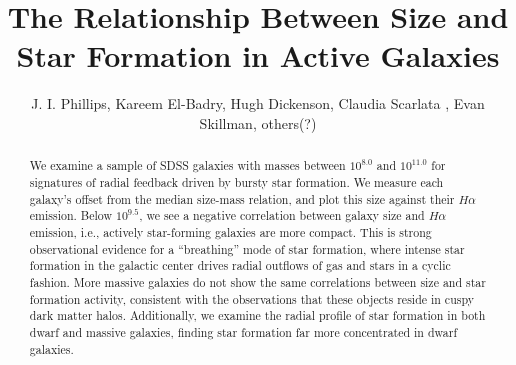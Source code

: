 \documentclass[iop]{emulateapj}
\begin{document}

\title{The Relationship Between Size and Star Formation in Active Galaxies}


\author{J. I. Phillips, Kareem El-Badry, Hugh Dickenson,  Claudia Scarlata , Evan Skillman, others(?)}




\begin{abstract}
We examine a sample of SDSS galaxies with masses between $10^{8.0}$ and $10^{11.0}$ for signatures of radial feedback driven by bursty star formation. We measure each galaxy's offset from the median size-mass relation, and plot this size against their $H\alpha$ emission. Below $10^{9.5}$, we see a negative correlation between galaxy size and $H\alpha$ emission, i.e., actively star-forming galaxies are more compact. This is strong observational evidence for a ``breathing'' mode of star formation, where intense star formation in the galactic center drives radial outflows of gas and stars in a cyclic fashion. More massive galaxies do not show the same correlations between size and star formation activity, consistent with the observations that these objects reside in cuspy dark matter halos. Additionally, we examine the radial profile of star formation in both dwarf and massive galaxies, finding star formation far more concentrated in dwarf galaxies.
\end{abstract}
\end{document}
